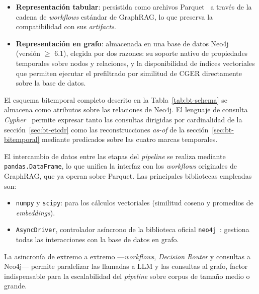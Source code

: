 \begin{itemize}
  \item \textbf{Representación tabular}: persistida como archivos Parquet~\cite{TODO_parquet} a través de la cadena de \emph{workflows} estándar de GraphRAG, lo que preserva la compatibilidad con sus \emph{artifacts}.
  \item \textbf{Representación en grafo}: almacenada en una base de datos Neo4j~\cite{TODO_neo4j} (versión $\geq$ 6.1), elegida por dos razones: su soporte nativo de propiedades temporales sobre nodos y relaciones, y la disponibilidad de índices vectoriales que permiten ejecutar el prefiltrado por similitud de CGER directamente sobre la base de datos.
\end{itemize}

El esquema bitemporal completo descrito en la Tabla~\ref{tab:bt-schema} se almacena como atributos sobre las relaciones de Neo4j. El lenguaje de consulta \emph{Cypher}~\cite{TODO_cypher} permite expresar tanto las consultas dirigidas por cardinalidad de la sección~\ref{sec:bt-etcdr} como las reconstrucciones \emph{as-of} de la sección~\ref{sec:bt-bitemporal} mediante predicados sobre las cuatro marcas temporales.

El intercambio de datos entre las etapas del \emph{pipeline} se realiza mediante \texttt{pandas.DataFrame}, lo que unifica la interfaz con los \emph{workflows} originales de GraphRAG, que ya operan sobre Parquet. Las principales bibliotecas empleadas son:

\begin{itemize}
  \item \texttt{numpy} y \texttt{scipy}: para los cálculos vectoriales (similitud coseno y promedios de \emph{embeddings}).
  \item \texttt{AsyncDriver}, controlador asíncrono de la biblioteca oficial \texttt{neo4j}~\cite{TODO_neo4j_async_driver}: gestiona todas las interacciones con la base de datos en grafo.
\end{itemize}

La asincronía de extremo a extremo ---\emph{workflows}, \emph{Decision Router} y consultas a Neo4j--- permite paralelizar las llamadas a LLM y las consultas al grafo, factor indispensable para la escalabilidad del \emph{pipeline} sobre corpus de tamaño medio o grande.

